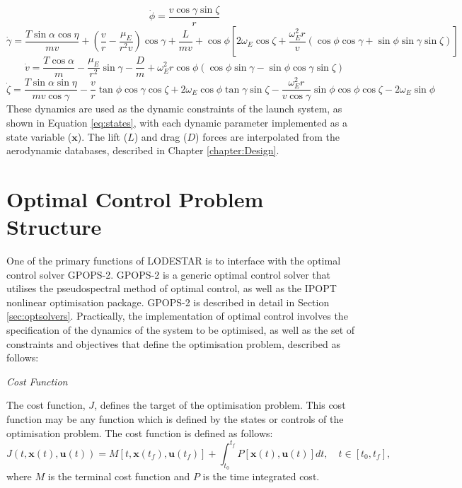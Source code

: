 \begin{equation}
\dot{\phi} = \frac{v\cos\gamma\sin\zeta}{r}
\end{equation}
\begin{equation}
\dot{\gamma} = \frac{T\sin\alpha \cos\eta}{mv} + (\frac{v}{r}-\frac{\mu_E}{r^2 v})\cos\gamma + \frac{L}{mv}
+ \cos\phi[2\omega_E \cos\zeta + \frac{\omega_E^2 r}{v}(\cos\phi\cos\gamma+\sin\phi\sin\gamma\sin\zeta)]
\end{equation}
\begin{equation}
\dot{v} = \frac{T\cos\alpha}{m}-\frac{\mu_E}{r^2}\sin\gamma - \frac{D}{m}
+ \omega_E^2 r\cos\phi(\cos\phi\sin\gamma-\sin\phi\cos\gamma\sin\zeta)
\end{equation}
\begin{equation}\label{eq:heading}
\dot{\zeta} = \frac{T\sin\alpha \sin\eta}{mv \cos \gamma}-\frac{v}{r}\tan\phi\cos\gamma\cos\zeta +2\omega_E\cos\phi\tan\gamma\sin\zeta - \frac{\omega_E^2 r}{v\cos\gamma}\sin\phi\cos\phi\cos\zeta-2\omega_E\sin\phi 
\end{equation}
These dynamics are used as the dynamic constraints of the launch system, as shown in Equation \ref{eq:states}, with each dynamic parameter implemented as a state variable ($\mathbf{x}$). The lift ($L$) and drag ($D$) forces are interpolated from the aerodynamic databases, described in Chapter \ref{chapter:Design}.

\section{Optimal Control Problem Structure}\label{sec:optstruct}

One of the primary functions of LODESTAR is to interface with the optimal control solver GPOPS-2. GPOPS-2 is a generic optimal control solver that utilises the pseudospectral method of optimal control, as well as the IPOPT nonlinear optimisation package. GPOPS-2 is described in detail in Section \ref{sec:optsolvers}. Practically, the implementation of optimal control involves the specification of the dynamics of the system to be optimised, as well as the set of constraints and objectives that define the optimisation problem, described as follows:

\noindent \textit{Cost Function}

\noindent The cost function, $J$, defines the target of the optimisation problem. 
This cost function may be any function which is defined by the states or controls of the optimisation problem. The cost function is defined as follows:
\begin{equation} \label{eq:cost}
J(t,\textbf{x}(t),\textbf{u}(t)) = M[t,\textbf{x}(t_f),\textbf{u}(t_f)] +   \int_{t_0}^{t_f} P[\textbf{x}(t),\textbf{u}(t)] dt, \quad t \in [t_0,t_f],
\end{equation}
where $M$ is the terminal cost function and $P$ is the time integrated cost. 


